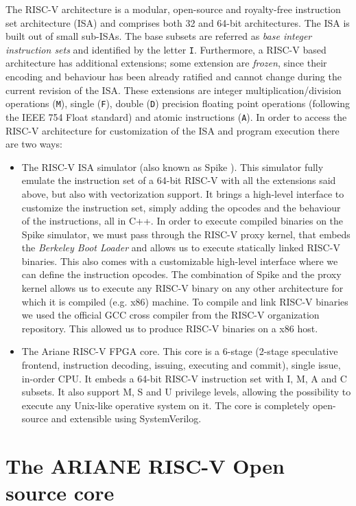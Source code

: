 The RISC-V \cite{riscvisa} architecture is a modular, open-source and royalty-free instruction set architecture (ISA) and comprises both 32 and 64-bit architectures. The ISA is built out of small sub-ISAs. The base subsets are referred as \textit{base integer instruction sets} and identified by the letter \texttt{I}. Furthermore, a RISC-V based architecture has additional extensions; some extension are \textit{frozen}, since their encoding and behaviour has been already ratified and cannot change during the current revision of the ISA. These extensions are integer multiplication/division operations (\texttt{M}), single (\texttt{F}), double (\texttt{D}) precision floating point operations (following the IEEE 754 Float standard) and atomic instructions (\texttt{A}). In order to access the RISC-V architecture for customization of the ISA and program execution there are two ways:
\begin{itemize}
    \item The RISC-V ISA simulator (also known as Spike \cite{riscvisasim}). This simulator fully emulate the instruction set of a 64-bit RISC-V with all the extensions said above, but also with vectorization support. It brings a high-level interface to customize the instruction set, simply adding the opcodes and the behaviour of the instructions, all in C++. In order to execute compiled binaries on the Spike simulator, we must pass through the RISC-V proxy kernel, that embeds the \textit{Berkeley Boot Loader} and allows us to execute statically linked RISC-V binaries. This also comes with a customizable high-level interface where we can define the instruction opcodes. The combination of Spike and the proxy kernel allows us to execute any RISC-V binary on any other architecture for which it is compiled (e.g. x86) machine. To compile and link RISC-V binaries we used the official GCC cross compiler from the RISC-V organization repository. This allowed us to produce RISC-V binaries on a x86 host.
    \item The Ariane RISC-V FPGA core. This core is a 6-stage (2-stage speculative frontend, instruction decoding, issuing, executing and commit), single issue, in-order CPU. It embeds a 64-bit RISC-V instruction set with I, M, A and C subsets. It also support M, S and U privilege levels, allowing the possibility to execute any Unix-like operative system on it. The core is completely open-source and extensible using SystemVerilog.
\end{itemize}

\section{The ARIANE RISC-V Open source core}
